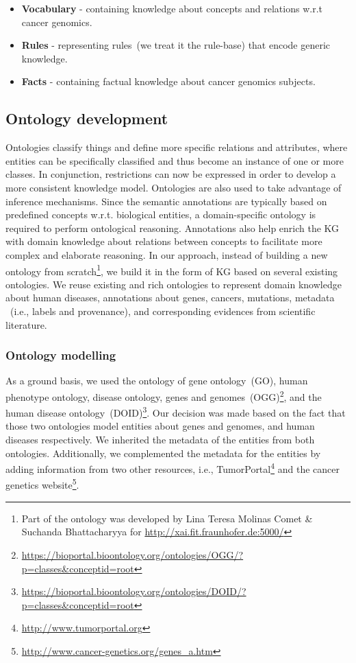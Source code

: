 \vspace{-2mm}
\begin{itemize}[noitemsep]
    \item \textbf{Vocabulary} - containing knowledge about concepts and relations w.r.t cancer genomics. 
    \item \textbf{Rules} - representing rules~(we treat it the rule-base) that encode generic knowledge. 
    \item \textbf{Facts} - containing factual knowledge about cancer genomics subjects.
    \vspace{-4mm}
\end{itemize}

\subsection{Ontology development}
Ontologies classify things and define more specific relations and attributes, where entities can be specifically classified and thus become an
instance of one or more classes. In conjunction, restrictions can now be expressed in order to develop a more consistent knowledge model. Ontologies are also used to take advantage of inference mechanisms. Since the semantic annotations are typically based on predefined concepts w.r.t. biological entities, a domain-specific ontology is required to perform ontological reasoning. Annotations also help enrich the KG with domain knowledge about relations between concepts to facilitate more complex and elaborate reasoning. In our approach, instead of building a new ontology from scratch\footnote{Part of the ontology was developed by Lina Teresa Molinas Comet \& Suchanda Bhattacharyya for \url{http://xai.fit.fraunhofer.de:5000/}}, we build it in the form of KG based on several existing ontologies. We reuse existing and rich ontologies to represent domain knowledge about human diseases, annotations about genes, cancers, mutations, metadata ~(i.e., labels and provenance), and corresponding evidences from scientific literature. 

\subsubsection{Ontology modelling}
As a ground basis, we used the ontology of gene ontology~(GO), human phenotype ontology, disease ontology, genes and genomes~(OGG)\footnote{\url{https://bioportal.bioontology.org/ontologies/OGG/?p=classes&conceptid=root}}, and the human disease ontology~(DOID)\footnote{\url{https://bioportal.bioontology.org/ontologies/DOID/?p=classes&conceptid=root}}. Our decision was made based on the fact that those two ontologies model entities about genes and genomes, and human diseases respectively. We inherited the metadata of the entities from both ontologies. Additionally, we complemented the metadata for the entities by adding information from two other resources, i.e., TumorPortal\footnote{\url{http://www.tumorportal.org}} and the cancer genetics website\footnote{\url{http://www.cancer-genetics.org/genes_a.htm}}. 

